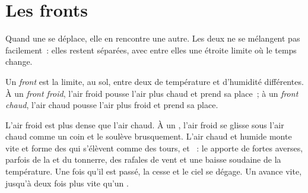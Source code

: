 \section{Les fronts}

Quand une  se déplace, elle en rencontre une autre. Les deux ne
se mélangent pas facilement~: elles restent séparées, avec entre elles une
étroite limite où le temps change.

\begin{definition}[Front]\label{def:g8:fronts-and-weather-maps:front}
Un \emph{front} est la limite, au sol, entre deux  de température et d'humidité différentes. À un \emph{front froid},
l'air froid pousse l'air plus chaud et prend sa place~; à un
\emph{front chaud}, l'air chaud pousse l'air plus froid
et prend sa place.
\end{definition}

L'air froid est plus dense que l'air chaud. À un , l'air froid
se glisse sous l'air chaud comme un coin et le soulève brusquement. L'air
chaud et humide monte vite et forme des  qui s'élèvent comme des
tours,  et ~: le  apporte de fortes averses,
parfois de la  et du tonnerre, des rafales de vent et une baisse
soudaine de la température. Une fois qu'il est passé, la  cesse et le
ciel se dégage. Un  avance vite, jusqu'à deux fois plus vite
qu'un .


